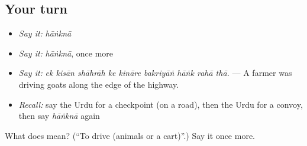 \subsection*{Your turn}
\begin{itemize}
\raggedright
  \item \emph{Say it:} \emph{hāṅknā}
  \item \emph{Say it:} \emph{hāṅknā}, once more
  \item \emph{Say it:} \emph{ek kisān shāhrāh ke kināre bakriyāṅ hāṅk rahā thā.} — A farmer was driving goats along the edge of the highway.
  \item \emph{Recall:} say the Urdu for a checkpoint (on a road), then the Urdu for a convoy, then say \emph{hāṅknā} again
\end{itemize}

\begin{tcolorbox}[breakable,colback=teal!4,colframe=teal!35!black,title={Before you move on}]
What does  mean? (\textquotedblleft{}To drive (animals or a cart)\textquotedblright{}.) Say it once more.
\end{tcolorbox}
